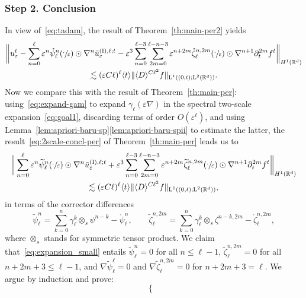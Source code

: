 \documentclass[JEP,XML,SOM,Unicode,published]{cedram}
\theoremstyle{plain}
\theoremstyle{definition}
\numberwithin{equation}{section}
\newcommand{\e}{\varepsilon}
\newcommand{\R}{\mathbb R}
\newcommand{\Ld}{\operatorname{L}}
\newcommand{\step}[1]{\subsubsection*{Step \textup #1}}
\begin{document}
\step{2. Conclusion}
In view of~\eqref{eq:tadam}, the result of Theorem~\ref{th:main-per2} yields
\begin{multline*}
\bigg\|u_\e^t
-\sum_{n=0}^\ell\e^{n}\mathring\psi_\ell^{n}(\sfrac{\cdot}{\e})\odot\nabla^{n}\bar{u}^{\text{(I)},\ell;t}_{\e}
-\e^3\sum_{n=0}^{\ell-3}\sum_{2m=0}^{\ell-n-3}\e^{n+2m}\mathring\zeta_\ell^{n,2m}(\sfrac\cdot\e)\odot\nabla^{n+1}\partial_t^{2m}f^t\bigg\|_{H^1(\R^d)}\\
\lesssim
(\e C\ell)^{\ell} \langle t\rangle \|\langle D\rangle^{C\ell^2} f\|_{\Ld^1((0,t);\Ld^2(\R^d))}.
\end{multline*}
{{Now we compare this with the result of Theorem~\ref{th:main-per}:
using~\eqref{eq:expand-gam} to expand $\gamma_{\ell}(\e\nabla)$ in the spectral two-scale expansion~\eqref{eq:goal1}, discarding terms of order $O(\e^{\ell})$, and using Lemma~\ref{lem:apriori-baru-sp}\eqref{lem:apriori-baru-spii} to estimate the latter, the result~\eqref{eq:2scale-concl-per} of Theorem~\ref{th:main-per} leads us to}\vspace*{-5pt}
\begin{multline}\label{eq:expansion_small}
\bigg\|
\sum_{n=0}^\ell\e^{n}\widetilde{\psi}_{\ell}^n(\sfrac{\cdot}{\e})\odot\nabla^{n}\bar{u}^{\text{(I)},\ell;t}_{\e}
+\e^3\sum_{n=0}^{\ell-3}\sum_{2m=0}^{\ell-n-3}\e^{n+2m}\widetilde{\zeta}_{\ell}^{n,2m}(\sfrac{\cdot}{\e})\odot\nabla^{n+1}\partial_t^{2m}f^t\bigg\|_{H^1(\R^d)}\\
\lesssim
(\e C\ell)^{\ell} \langle t\rangle \|\langle D\rangle^{C\ell^2} f\|_{\Ld^1((0,t);\Ld^2(\R^d))},
\end{multline}
in terms of the corrector differences\vspace*{-3pt}
\begin{equation*}
\widetilde{\psi}_{\ell}^n=\sum_{k=0}^n\gamma_{\ell}^k\otimes_s\psi^{n-k}-\mathring\psi_\ell^{n},\qquad \widetilde{\zeta}_{\ell}^{n,2m}=\sum_{k=0}^n\gamma_{\ell}^k\otimes_s\zeta^{n-k,2m}-\mathring\zeta_\ell^{n,2m},
\end{equation*}
{where $\otimes_s$ stands for symmetric tensor product.
We claim that~\eqref{eq:expansion_small} entails $\widetilde{\psi}_{\ell}^n=0$ for all $n\leq \ell-1$, $\widetilde{\zeta}_{\ell}^{n,2m}=0$ for all $n+2m+3\leq\ell-1$, and $\nabla\widetilde{\psi}_{\ell}^{\ell}=0$ and $\nabla \widetilde{\zeta}_{\ell}^{n,2m}=0$ for $n+2m+3=\ell$.
We argue by induction and prove:\vspace*{-3pt}
\begin{equation}\label{eq:iterate-vanishcorrdiff}
\left\{\begin{array}{lll}

\end{array}
\end{equation}}}
\end{document}
